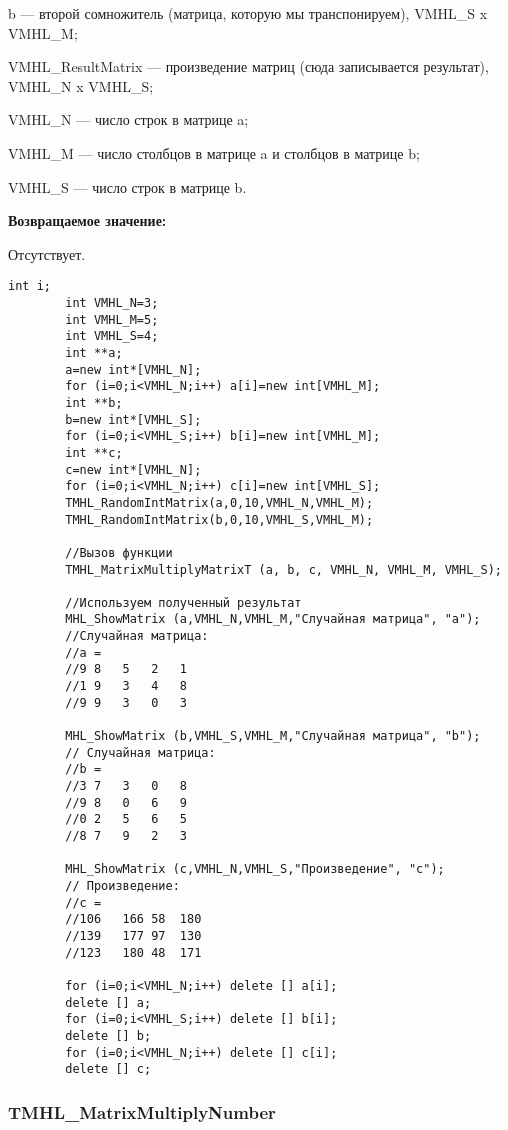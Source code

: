 \documentclass[a4paper,12pt]{article}
\begin{document}
b --- второй сомножитель (матрица, которую мы транспонируем), VMHL\_S x VMHL\_M;
 
VMHL\_ResultMatrix --- произведение матриц (сюда записывается результат), VMHL\_N x VMHL\_S;
 
VMHL\_N --- число строк в матрице a;
 
VMHL\_M --- число столбцов в матрице a и столбцов в матрице b;
 
VMHL\_S --- число строк в матрице b.

\textbf{Возвращаемое значение:}

Отсутствует.


\begin{lstlisting}[label=code_use_TMHL_MatrixMultiplyMatrixT,caption=Пример использования]
        int i;
        int VMHL_N=3;
        int VMHL_M=5;
        int VMHL_S=4;
        int **a;
        a=new int*[VMHL_N];
        for (i=0;i<VMHL_N;i++) a[i]=new int[VMHL_M];
        int **b;
        b=new int*[VMHL_S];
        for (i=0;i<VMHL_S;i++) b[i]=new int[VMHL_M];
        int **c;
        c=new int*[VMHL_N];
        for (i=0;i<VMHL_N;i++) c[i]=new int[VMHL_S];
        TMHL_RandomIntMatrix(a,0,10,VMHL_N,VMHL_M);
        TMHL_RandomIntMatrix(b,0,10,VMHL_S,VMHL_M);

        //Вызов функции
        TMHL_MatrixMultiplyMatrixT (a, b, c, VMHL_N, VMHL_M, VMHL_S);

        //Используем полученный результат
        MHL_ShowMatrix (a,VMHL_N,VMHL_M,"Случайная матрица", "a");
        //Случайная матрица:
        //a =
        //9	8	5	2	1
        //1	9	3	4	8
        //9	9	3	0	3

        MHL_ShowMatrix (b,VMHL_S,VMHL_M,"Случайная матрица", "b");
        // Случайная матрица:
        //b =
        //3	7	3	0	8
        //9	8	0	6	9
        //0	2	5	6	5
        //8	7	9	2	3

        MHL_ShowMatrix (c,VMHL_N,VMHL_S,"Произведение", "c");
        // Произведение:
        //c =
        //106	166	58	180
        //139	177	97	130
        //123	180	48	171

        for (i=0;i<VMHL_N;i++) delete [] a[i];
        delete [] a;
        for (i=0;i<VMHL_S;i++) delete [] b[i];
        delete [] b;
        for (i=0;i<VMHL_N;i++) delete [] c[i];
        delete [] c;
\end{lstlisting}

\subsubsection{TMHL\_MatrixMultiplyNumber}\label{TMHL_MatrixMultiplyNumber}
\end{document}
